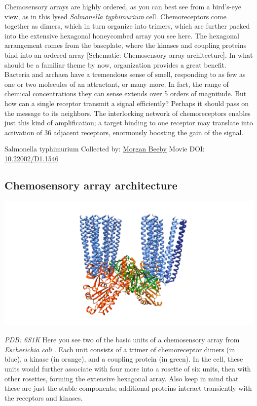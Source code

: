 \documentclass[]{tufte-book}
\begin{document}
Chemosensory arrays are highly ordered, as you can best see from a bird's-eye view, as in this lysed \emph{Salmonella typhimurium} cell. Chemoreceptors come together as dimers, which in turn organize into trimers, which are further packed into the extensive hexagonal honeycombed array you see here. The hexagonal arrangement comes from the baseplate, where the kinases and coupling proteins bind into an ordered array {[}Schematic: Chemosensory array architecture{]}. In what should be a familiar theme by now, organization provides a great benefit. Bacteria and archaea have a tremendous sense of smell, responding to as few as one or two molecules of an attractant, or many more. In fact, the range of chemical concentrations they can sense extends over 5 orders of magnitude. But how can a single receptor transmit a signal efficiently? Perhaps it should pass on the message to its neighbors. The interlocking network of chemoreceptors enables just this kind of amplification; a target binding to one receptor may translate into activation of 36 adjacent receptors, enormously boosting the gain of the signal.



\hypertarget{htmlwidget-4eda78007076e95f0621}{}

\label{fig:7-2}Salmonella typhimurium Collected by: \protect\hyperlink{morgan_beeby}{Morgan Beeby} Movie DOI: \href{https://doi.org/10.22002/D1.1546}{10.22002/D1.1546}

\hypertarget{Chemosensory_array_architecture}{%
\subsection{Chemosensory array architecture}\label{Chemosensory_array_architecture}}

\includegraphics{img/schematics/7_2_1}

\emph{PDB: 6S1K}
Here you see two of the basic units of a chemosensory array from \emph{Escherichia coli} \citep{cassidy2020}. Each unit consists of a trimer of chemoreceptor dimers (in blue), a kinase (in orange), and a coupling protein (in green). In the cell, these units would further associate with four more into a rosette of six units, then with other rosettes, forming the extensive hexagonal array. Also keep in mind that these are just the stable components; additional proteins interact transiently with the receptors and kinases.
\end{document}
